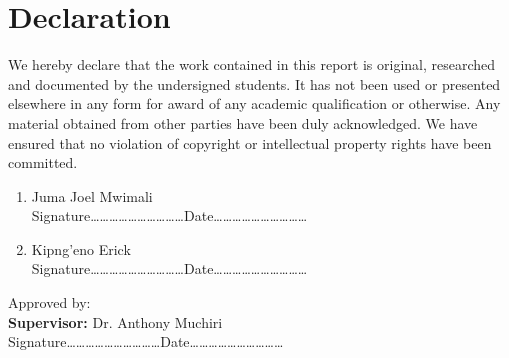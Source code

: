 \section*{Declaration}


We hereby declare that the work contained in this report is original, researched and documented by the undersigned students. It has not been used or presented elsewhere in any form for award of any academic qualification or otherwise. Any material obtained from other parties have been duly acknowledged. We have ensured that no violation of copyright or intellectual property rights have been committed.
\begin{enumerate}
	\item Juma Joel Mwimali \vspace*{.2cm}\\
	Signature\ldots\ldots\ldots\ldots\ldots\ldots\ldots\ldots\ldots\ldots Date\ldots\ldots\ldots\ldots\ldots\ldots\ldots\ldots\ldots\ldots
	\item Kipng'eno Erick \vspace*{.2cm}\\
	Signature\ldots\ldots\ldots\ldots\ldots\ldots\ldots\ldots\ldots\ldots Date\ldots\ldots\ldots\ldots\ldots\ldots\ldots\ldots\ldots\ldots
\end{enumerate}

\vspace*{1cm}
Approved by:\\
\textbf{Supervisor: } Dr. Anthony Muchiri\vspace*{.2cm}\\
Signature\ldots\ldots\ldots\ldots\ldots\ldots\ldots\ldots\ldots\ldots Date\ldots\ldots\ldots\ldots\ldots\ldots\ldots\ldots\ldots\ldots


